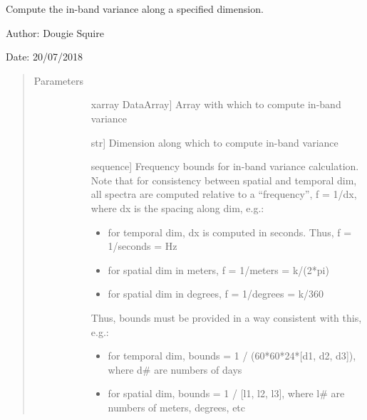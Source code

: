 \documentclass[letterpaper,10pt,english]{sphinxmanual}
\begin{document}
\begin{fulllineitems}
\label{\detokenize{diagnostic_doc:diagnostic.inband_variance}}
Compute the in-band variance along a specified dimension.

\begin{DUlineblock}{0em}
\item[] Author: Dougie Squire
\item[] Date: 20/07/2018
\end{DUlineblock}
\begin{quote}\begin{description}
\item[{Parameters}] \leavevmode\begin{description}
\item[{}] \leavevmode{[}xarray DataArray{]}
Array with which to compute in-band variance

\item[{}] \leavevmode{[}str{]}
Dimension along which to compute in-band variance

\item[{}] \leavevmode{[}sequence{]}
Frequency bounds for in-band variance calculation. Note that for consistency between                     spatial and temporal dim, all spectra are computed relative to a “frequency”, f = 1/dx,                     where dx is the spacing along dim, e.g.:
\begin{itemize}
\item {} 
for temporal dim, dx is computed in seconds. Thus, f = 1/seconds = Hz

\item {} 
for spatial dim in meters, f = 1/meters = k/(2*pi)

\item {} 
for spatial dim in degrees, f = 1/degrees = k/360

\end{itemize}

Thus, bounds must be provided in a way consistent with this, e.g.:
\begin{itemize}
\item {} 
for temporal dim, bounds = 1 / (60*60*24*{[}d1, d2, d3{]}), where d\# are numbers of days

\item {} 
for spatial dim, bounds = 1 / {[}l1, l2, l3{]}, where l\# are numbers of meters, degrees, etc


\end{itemize}
\end{description}
\end{description}
\end{quote}
\end{fulllineitems}
\end{document}

